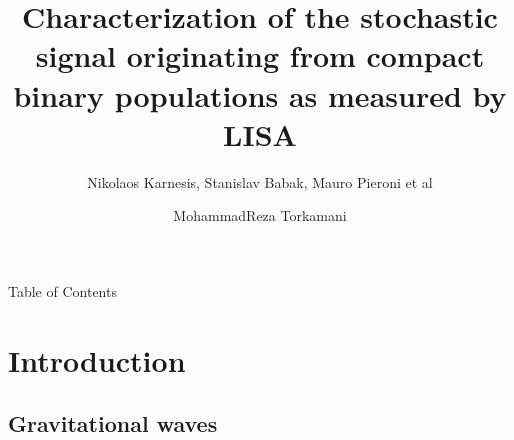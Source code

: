 \documentclass[pdf]{beamer}
\title[Stochastic signal originating from CBs mesured by LISA]{Characterization of the stochastic signal originating from compact binary populations as measured by LISA}
\subtitle{Nikolaos Karnesis, Stanislav Babak, Mauro Pieroni et al}
\author{MohammadReza Torkamani}
\begin{document}

\begin{frame}
    \titlepage
\end{frame}

\begin{frame}{Table of Contents}
\vspace*{.1cm}
  \tableofcontents
\end{frame}
\section{Introduction}
\subsection{Gravitational waves}
\end{document}
